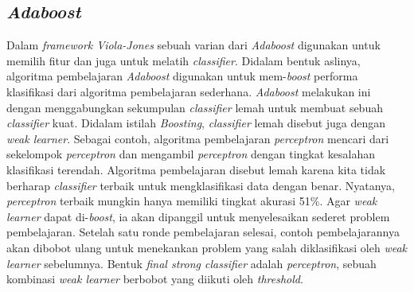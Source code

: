 \subsection{\emph{Adaboost}}
Dalam \emph{framework Viola-Jones} sebuah varian dari \emph{Adaboost} 
digunakan untuk memilih fitur dan juga untuk melatih \textit{classifier}. 
Didalam bentuk aslinya, algoritma pembelajaran \emph{Adaboost} digunakan 
untuk mem-\textit{boost} performa klasifikasi dari algoritma pembelajaran 
sederhana. \emph{Adaboost} melakukan ini dengan menggabungkan sekumpulan 
\emph{classifier} lemah untuk membuat sebuah \emph{classifier} kuat. 
Didalam istilah \emph{Boosting}, \emph{classifier} lemah disebut juga 
dengan \emph{weak learner}. Sebagai contoh, algoritma pembelajaran \emph{perceptron} 
mencari dari sekelompok \emph{perceptron} dan mengambil \emph{perceptron} 
dengan tingkat kesalahan klasifikasi terendah. Algoritma pembelajaran disebut 
lemah karena kita tidak berharap \emph{classifier} terbaik untuk mengklasifikasi 
data dengan benar. Nyatanya, \emph{perceptron} terbaik mungkin 
hanya memiliki tingkat akurasi 51\%. Agar \emph{weak learner} dapat di-\textit{boost}, 
ia akan dipanggil untuk menyelesaikan sederet problem pembelajaran. Setelah 
satu ronde pembelajaran selesai, contoh pembelajarannya akan dibobot ulang 
untuk menekankan problem yang salah diklasifikasi oleh \emph{weak learner} 
sebelumnya. Bentuk \emph{final strong classifier} adalah \emph{perceptron}, 
sebuah kombinasi \emph{weak learner} berbobot yang diikuti oleh \emph{threshold}.

